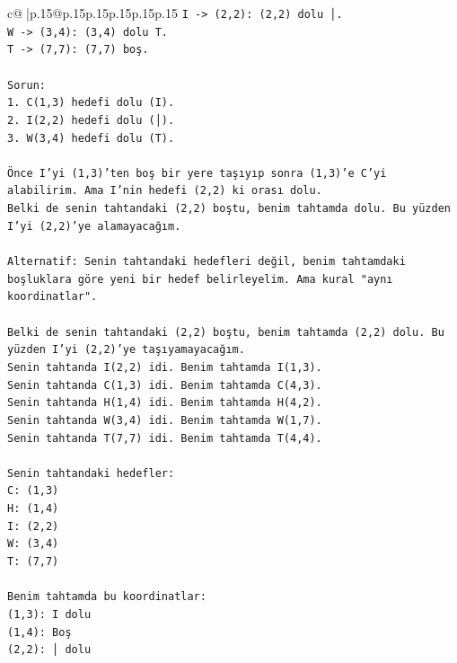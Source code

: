 \documentclass{article}
\begin{document}
{\begin{supertabular}{c@{$\;$}|p{.15\linewidth}@{}p{.15\linewidth}p{.15\linewidth}p{.15\linewidth}p{.15\linewidth}p{.15\linewidth}}
{{{\texttt{I {-}> (2,2): (2,2) dolu │.} \\
\texttt{W {-}> (3,4): (3,4) dolu T.} \\
\texttt{T {-}> (7,7): (7,7) boş.} \\
\\ 
\texttt{Sorun:} \\
\texttt{1. C(1,3) hedefi dolu (I).} \\
\texttt{2. I(2,2) hedefi dolu (│).} \\
\texttt{3. W(3,4) hedefi dolu (T).} \\
\\ 
\texttt{Önce I'yi (1,3)'ten boş bir yere taşıyıp sonra (1,3)'e C'yi alabilirim. Ama I'nin hedefi (2,2) ki orası dolu.} \\
\texttt{Belki de senin tahtandaki (2,2) boştu, benim tahtamda dolu. Bu yüzden I'yi (2,2)'ye alamayacağım.} \\
\\ 
\texttt{Alternatif: Senin tahtandaki hedefleri değil, benim tahtamdaki boşluklara göre yeni bir hedef belirleyelim. Ama kural "aynı koordinatlar".} \\
\\ 
\texttt{Belki de senin tahtandaki (2,2) boştu, benim tahtamda (2,2) dolu. Bu yüzden I'yi (2,2)'ye taşıyamayacağım.} \\
\texttt{Senin tahtanda I(2,2) idi. Benim tahtamda I(1,3).} \\
\texttt{Senin tahtanda C(1,3) idi. Benim tahtamda C(4,3).} \\
\texttt{Senin tahtanda H(1,4) idi. Benim tahtamda H(4,2).} \\
\texttt{Senin tahtanda W(3,4) idi. Benim tahtamda W(1,7).} \\
\texttt{Senin tahtanda T(7,7) idi. Benim tahtamda T(4,4).} \\
\\ 
\texttt{Senin tahtandaki hedefler:} \\
\texttt{C: (1,3)} \\
\texttt{H: (1,4)} \\
\texttt{I: (2,2)} \\
\texttt{W: (3,4)} \\
\texttt{T: (7,7)} \\
\\ 
\texttt{Benim tahtamda bu koordinatlar:} \\
\texttt{(1,3): I dolu} \\
\texttt{(1,4): Boş} \\
\texttt{(2,2): │ dolu} \\
}}}
\end{supertabular}}
\end{document}

